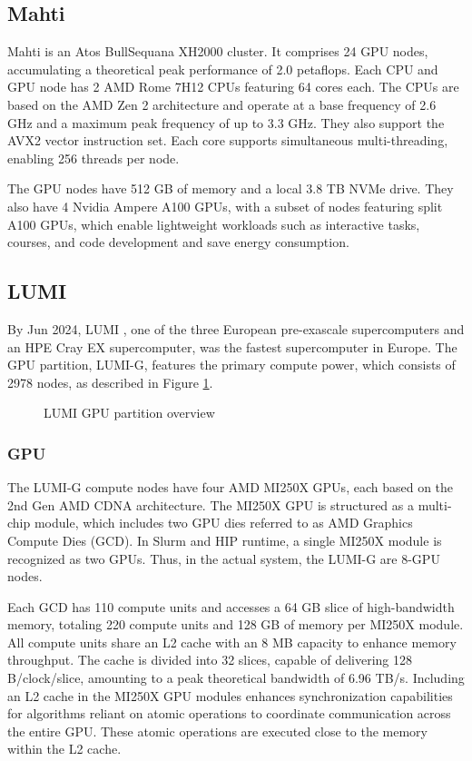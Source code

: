 \subsection{Mahti}

Mahti \cite{mahti} is an Atos BullSequana XH2000 cluster. It comprises 24 GPU nodes, accumulating a theoretical peak performance of 2.0 petaflops. Each CPU and GPU node has 2 AMD Rome 7H12 CPUs featuring 64 cores each. The CPUs are based on the AMD Zen 2 architecture and operate at a base frequency of 2.6 GHz and a maximum peak frequency of up to 3.3 GHz. They also support the AVX2 vector instruction set. Each core supports simultaneous multi-threading, enabling 256 threads per node.

The GPU nodes have 512 GB of memory and a local 3.8 TB NVMe drive. They also have 4 Nvidia Ampere A100 GPUs, with a subset of nodes featuring split A100 GPUs, which enable lightweight workloads such as interactive tasks, courses, and code development and save energy consumption.

\subsection{LUMI}
\label{subsec:lumi}
By Jun 2024, LUMI \cite{lumi}, one of the three European pre-exascale supercomputers and an HPE Cray EX supercomputer, was the fastest supercomputer in Europe. The GPU partition, LUMI-G, features the primary compute power, which consists of 2978 nodes, as described in Figure \ref{fig_lumig_overview}.

\begin{figure}[H]
    \centering
    \caption{LUMI GPU partition overview \cite{lumi}}
    \label{fig_lumig_overview}
\end{figure}

\subsubsection{GPU}

The LUMI-G compute nodes have four AMD MI250X GPUs, each based on the 2nd Gen AMD CDNA architecture. The MI250X GPU is structured as a multi-chip module, which includes two GPU dies referred to as AMD Graphics Compute Dies (GCD). In Slurm and HIP runtime, a single MI250X module is recognized as two GPUs. Thus, in the actual system, the LUMI-G are 8-GPU nodes.

Each GCD has 110 compute units and accesses a 64 GB slice of high-bandwidth memory, totaling 220 compute units and 128 GB of memory per MI250X module. All compute units share an L2 cache with an 8 MB capacity to enhance memory throughput. The cache is divided into 32 slices, capable of delivering 128 B/clock/slice, amounting to a peak theoretical bandwidth of 6.96 TB/s. Including an L2 cache in the MI250X GPU modules enhances synchronization capabilities for algorithms reliant on atomic operations to coordinate communication across the entire GPU. These atomic operations are executed close to the memory within the L2 cache.

